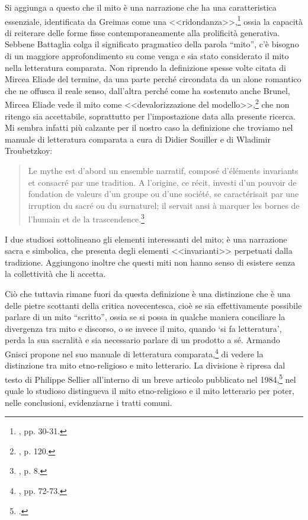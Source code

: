 \documentclass[12pt,a4paper,openright, oneside]{book}
\begin{document}
Si aggiunga a questo che il mito è una narrazione che ha una caratteristica essenziale, identificata da Greimas come una <<ridondanza>>,\footnote{\cite{Greimas}, pp. 30-31.} ossia la capacità di reiterare delle forme fisse contemporaneamente alla prolificità generativa.
Sebbene Battaglia colga il significato pragmatico della parola ``mito'', c'è bisogno di un maggiore approfondimento su come venga e sia stato considerato il mito nella letteratura comparata. Non riprendo la definizione spesse volte citata di Mircea Eliade del termine, da una parte perché circondata da un alone romantico che ne offusca il reale senso, dall'altra perché come ha sostenuto anche Brunel, Mircea Eliade vede il mito come <<devalorizzazione del modello>>,\footnote{\cite{Brunel3}, p. 120.} che non ritengo sia accettabile, soprattutto per l'impostazione data alla presente ricerca. Mi sembra infatti più calzante per il nostro caso la definizione che troviamo nel manuale di letteratura comparata a cura di Didier Souiller e di Wladimir Troubetzkoy:
\begin{quote}\begin{singlespace}
\footnotesize{Le mythe est d'abord un ensemble narratif, composé d'éléments invariants et consacré par une tradition. A l'origine, ce récit, investi d'un pouvoir de fondation de valeurs d'un groupe ou d'une société, se caractérisait par une irruption du sacré ou du surnaturel; il servait ansi à marquer les bornes de l'humain et de la trascendence.}\footnote{\cite{Souiller}, p. 8.}
\end{singlespace}\end{quote}

I due studiosi sottolineano gli elementi interessanti del mito; è una narrazione sacra e simbolica, che presenta degli elementi <<invarianti>> perpetuati dalla tradizione. Aggiungono inoltre che questi miti non hanno senso di esistere senza la collettività che li accetta.

Ciò che tuttavia rimane fuori da questa definizione è una distinzione che è una delle pietre scottanti della critica novecentesca, cioè se sia effettivamente possibile parlare di un mito ``scritto'', ossia se si possa in qualche maniera conciliare la divergenza tra mito e discorso, o se invece il mito, quando `si fa letteratura', perda la sua sacralità e sia necessario parlare di un prodotto a sé. Armando Gnisci propone nel suo manuale di letteratura comparata,\footnote{\cite{Gnisci}, pp. 72-73.} di vedere la distinzione tra mito etno-religioso e mito letterario. La divisione è ripresa dal testo di Philippe Sellier all'interno di un breve articolo pubblicato nel 1984,\footcite{Sellier} nel quale lo studioso distingueva il mito etno-religioso e il mito letterario per poter, nelle conclusioni, evidenziarne i tratti comuni. 
\end{document}
